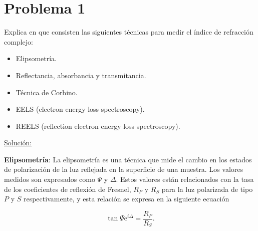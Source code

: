 \documentclass[a4paper,11pt]{article}
\numberwithin{equation}{section}
\renewcommand{\thefootnote}{\fnsymbol{footnote}}
\newcommand{\euler}{\mathrm{e}}
\begin{document}

\fancyhead[R]{\thepage}

\setcounter{footnote}{0}
\renewcommand*{\thefootnote}{\arabic{footnote}}


\section{Problema 1}

Explica en que consisten las siguientes técnicas para medir el índice de refracción complejo:

\begin{itemize}
 \item Elipsometría.
 \item Reflectancia, absorbancia y transmitancia.
 \item Técnica de Corbino.
 \item EELS (electron energy loss spectroscopy).
 \item REELS (reflection electron energy loss spectroscopy).
\end{itemize}

\vspace{.3cm}

\underline{Solución:} \vspace{.3cm}

\textbf{Elipsometría}: La elipsometría es una técnica que mide el cambio en los 
estados de polarización de la luz reflejada en la superficie de una muestra. Los 
valores medidos son expresados como $\Psi$ y $\Delta$. Estos valores están relacionados 
con la tasa de los coeficientes de reflexión de Fresnel, $R_P$ y $R_S$ para la 
luz polarizada de tipo $P$ y $S$ respectivamente, y esta relación se expresa 
en la siguiente ecuación 

\begin{equation}
 \tan{\Psi} \euler^{i\Delta} = \frac{R_P}{R_S}.
\end{equation}
\end{document}
